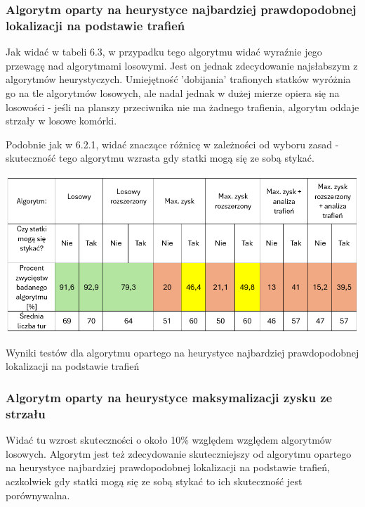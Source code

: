 \subsubsection{Algorytm oparty na heurystyce najbardziej prawdopodobnej lokalizacji na podstawie trafień}

Jak widać w tabeli 6.3, w przypadku tego algorytmu widać wyraźnie jego przewagę nad algorytmami losowymi. Jest on jednak zdecydowanie najsłabszym z algorytmów heurystyczych. Umiejętność 'dobijania' trafionych statków wyróżnia go na tle algorytmów losowych, ale nadal jednak w dużej mierze opiera się na losowości - jeśli na planszy przeciwnika nie ma żadnego trafienia, algorytm oddaje strzały w losowe komórki.

Podobnie jak w 6.2.1, widać znaczące różnicę w zależności od wyboru zasad - skuteczność tego algorytmu wzrasta gdy statki mogą się ze sobą stykać.

\begin{table}[!h]
    \centering
    \includegraphics[width=1\linewidth]{img/table-hit-heuristic.png}
    \caption{Wyniki testów dla algorytmu opartego na heurystyce najbardziej prawdopodobnej lokalizacji na podstawie trafień}
\end{table}

\subsubsection{Algorytm oparty na heurystyce maksymalizacji zysku ze strzału}

Widać tu wzrost skuteczności o około 10\% względem względem algorytmów losowych. Algorytm jest też zdecydowanie skuteczniejszy od algorytmu opartego na heurystyce najbardziej prawdopodobnej lokalizacji na podstawie trafień, aczkolwiek gdy statki mogą się ze sobą stykać to ich skuteczność jest porównywalna.

